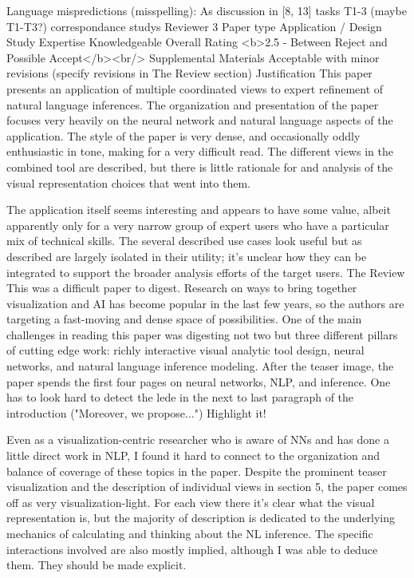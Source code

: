 Language mispredictions (misspelling):
As discussion in [8, 13]
tasks T1-3 (maybe T1-T3?)
correspondance 
studys
Reviewer 3
Paper type
Application / Design Study
Expertise
Knowledgeable
Overall Rating
<b>2.5 - Between Reject and Possible Accept</b><br/>
Supplemental Materials
Acceptable with minor revisions (specify revisions in The Review section)
Justification
This paper presents an application of multiple coordinated views to expert refinement of natural language inferences. The organization and presentation of the paper focuses very heavily on the neural network and natural language aspects of the application. The style of the paper is very dense, and occasionally oddly enthusiastic in tone, making for a very difficult read. The different views in the combined tool are described, but there is little rationale for and analysis of the visual representation choices that went into them.

The application itself seems interesting and appears to have some value, albeit apparently only for a very narrow group of expert users who have a particular mix of technical skills. The several described use cases look useful but as described are largely isolated in their utility; it's unclear how they can be integrated to support the broader analysis efforts of the target users.
The Review
This was a difficult paper to digest. Research on ways to bring together visualization and AI has become popular in the last few years, so the authors are targeting a fast-moving and dense space of possibilities. One of the main challenges in reading this paper was digesting not two but three different pillars of cutting edge work: richly interactive visual analytic tool design, neural networks, and natural language inference modeling. After the teaser image, the paper spends the first four pages on neural networks, NLP, and inference. One has to look hard to detect the lede in the next to last paragraph of the introduction ("Moreover, we propose...") Highlight it!

Even as a visualization-centric researcher who is aware of NNs and has done a little direct work in NLP, I found it hard to connect to the organization and balance of coverage of these topics in the paper. Despite the prominent teaser visualization and the description of individual views in section 5, the paper comes off as very visualization-light. For each view there it's clear what the visual representation is, but the majority of description is dedicated to the underlying mechanics of calculating and thinking about the NL inference. The specific interactions involved are also mostly implied, although I was able to deduce them. They should be made explicit.

